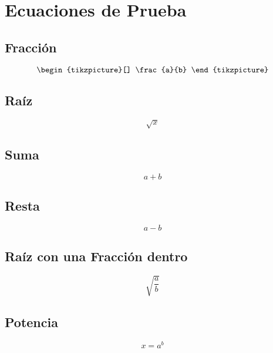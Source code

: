 \documentclass{article}
\begin{document}
\section*{Ecuaciones de Prueba}

\subsection*{Fracción}
\[
  \begin{tikzpicture}[]
    \frac{a}{b}
    \end{tikzpicture}
\]

\subsection*{Raíz}
\[
\sqrt{x}
\]

\subsection*{Suma}
\[
a + b
\]

\subsection*{Resta}

$$a - b$$

\subsection*{Raíz con una Fracción dentro}
\[
\sqrt{\frac{a}{b}}
\]

\subsection*{Potencia}
\[
x = a^b
\]
\end{document}

